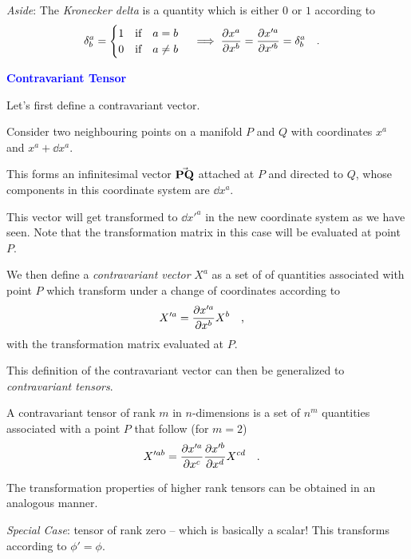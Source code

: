 \documentclass[landscape,aspectratio=169]{slides}
\begin{document}
\begin{slide}
	\textit{Aside}: The \textit{Kronecker delta} is a quantity which is either $ 0 $ or $ 1 $ according to
	\begin{equation}\label{key}
	\delta^a_b = \begin{cases}
	1 \qq{if} a = b\\
	0 \qq{if} a \ne b
	\end{cases} \implies \pdv{x^a}{x^b} = \pdv{x'^a}{x'^b} = \delta^a_b \qq{.}
	\end{equation}
\end{slide}

\begin{slide}
	\textcolor{blue}{\textbf{Contravariant Tensor}}
	
	Let's first define a contravariant vector.
	
	Consider two neighbouring points on a manifold $ P $ and $ Q $ with coordinates $ x^a $ and $ x^a + \dd{x^a} $.
	
	This forms an infinitesimal vector $ \va{PQ} $ attached at $ P $ and directed to $ Q $, whose components in this coordinate system are $ \dd{x^a} $. 
	
	This vector will get transformed to $ \dd{x'^a} $ in the new coordinate system as we have seen. Note that the transformation matrix in this case will be evaluated at point $ P $.
\end{slide}

\begin{slide}
	We then define a \textit{contravariant vector} $ X^a $ as a set of of quantities associated with point $ P $ which transform under a change of coordinates according to
	\begin{equation}\label{key}
	X'^a = \pdv{x'^a}{x^b} X^b \qq{,}
	\end{equation}
	with the transformation matrix evaluated at $ P $.
	
	This definition of the contravariant vector can then be generalized to \textit{contravariant tensors}. 
\end{slide}

\begin{slide}

	A contravariant tensor of rank $ m $ in $ n $-dimensions is a set of $ n^m $ quantities associated with a point $ P $ that follow (for $ m=2 $)
	\begin{equation}\label{key}
	X'^{ab} =  \pdv{x'^a}{x^c}  \pdv{x'^b}{x^d} X^{cd} \qq{.}
	\end{equation}
	
	The transformation properties of higher rank tensors can be obtained in an analogous manner. 
	
	\textit{Special Case}: tensor of rank zero -- which is basically a scalar! This transforms according to $ \phi' = \phi $.
\end{slide}
\end{document}
